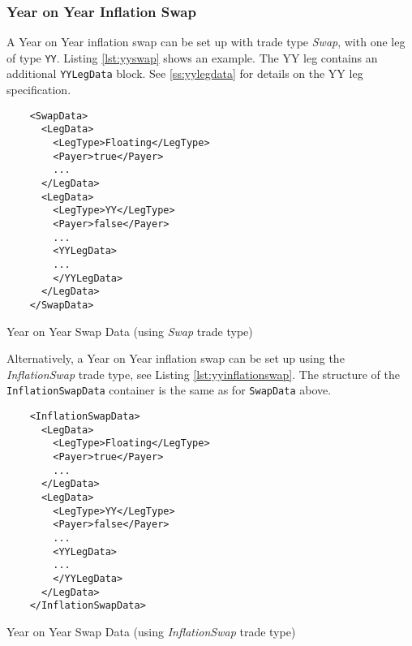 \subsubsection{Year on Year Inflation Swap}

\ifdefined{}\fi

A Year on Year inflation swap can be set up with trade type \emph{Swap}, with one leg of type {\tt YY}. Listing \ref{lst:yyswap} shows an
example. The YY leg contains an additional {\tt YYLegData} block. See \ref{ss:yylegdata} for details on the YY leg
specification.

\begin{listing}[H]
\begin{verbatim}
    <SwapData>
      <LegData>
        <LegType>Floating</LegType>
        <Payer>true</Payer>
        ...
      </LegData>
      <LegData>
        <LegType>YY</LegType>
        <Payer>false</Payer>
        ...
        <YYLegData>
        ...
        </YYLegData>
      </LegData>
    </SwapData>
\end{verbatim}
\caption{Year on Year Swap Data (using \emph{Swap} trade type)}
\label{lst:yyswap}
\end{listing}

Alternatively, a Year on Year inflation swap can be set up using the \emph{InflationSwap} trade type, see Listing \ref{lst:yyinflationswap}. The structure of the {\tt InflationSwapData} container is the same as for {\tt SwapData} above.

\begin{listing}[H]
\begin{verbatim}
    <InflationSwapData>
      <LegData>
        <LegType>Floating</LegType>
        <Payer>true</Payer>
        ...
      </LegData>
      <LegData>
        <LegType>YY</LegType>
        <Payer>false</Payer>
        ...
        <YYLegData>
        ...
        </YYLegData>
      </LegData>
    </InflationSwapData>
\end{verbatim}
\caption{Year on Year Swap Data (using \emph{InflationSwap} trade type)}
\label{lst:yyinflationswap}
\end{listing}
